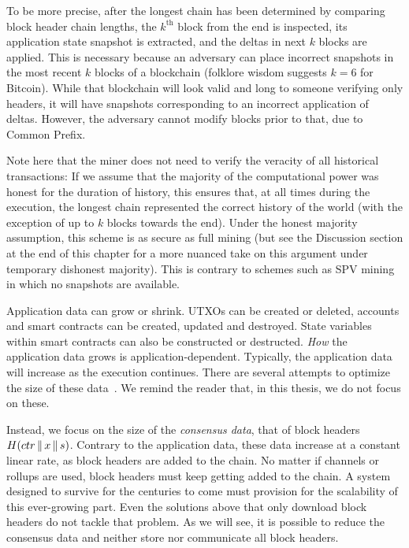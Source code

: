 To be more precise, after the longest chain has been
determined by comparing block header chain lengths, the $k^\text{th}$ block from the
end is inspected, its application state snapshot is extracted, and the deltas
in next $k$ blocks are applied. This is necessary because an adversary can place incorrect
snapshots in the most recent $k$ blocks of a blockchain (folklore wisdom
suggests $k = 6$ for Bitcoin). While that blockchain
will look valid and long to someone verifying only headers, it will have snapshots
corresponding to an incorrect application of deltas. However, the adversary
cannot modify blocks prior to that, due to Common Prefix.

Note here that the miner does not need to verify the veracity of all historical
transactions: If we assume that the majority of the computational power was
honest for the duration of history, this ensures that, at all times during the
execution, the longest chain represented the correct history of the world (with
the exception of up to $k$ blocks towards the end). Under the honest majority
assumption, this scheme is as secure as full mining (but see the Discussion section
at the end of this chapter for a more nuanced take on this argument under temporary dishonest majority).
This is contrary to schemes such as SPV mining in which no snapshots are available.

Application data can grow or shrink. UTXOs can be created or deleted, accounts and
smart contracts can be created, updated and destroyed. State variables within smart
contracts can also be constructed or destructed. \emph{How} the application data grows is
ap\-pli\-ca\-tion-de\-pen\-dent. Typically, the application data will increase as the execution
continues. There are several attempts to optimize the size of these
data~\cite{edrax,lightning,composable-lightning,cerberus,brick,starks,truebit}.
We remind the reader that, in this thesis, we do not focus on these.

Instead, we focus on the size of the \emph{consensus data}, that of block headers
$H(ctr \allowbreak \,\|\, \allowbreak x \allowbreak \,\|\, \allowbreak s)$.
Contrary to the application data, these data increase
at a constant linear rate, as block headers are added to the chain. No matter if
channels or rollups are used, block headers must keep getting added to the chain.
A system designed to survive for the centuries to come
must provision for the scalability of this ever-growing part.
Even the solutions above that only download block headers do not tackle that problem.
As we will
see, it is possible to reduce the consensus data and neither store nor communicate
all block headers.

